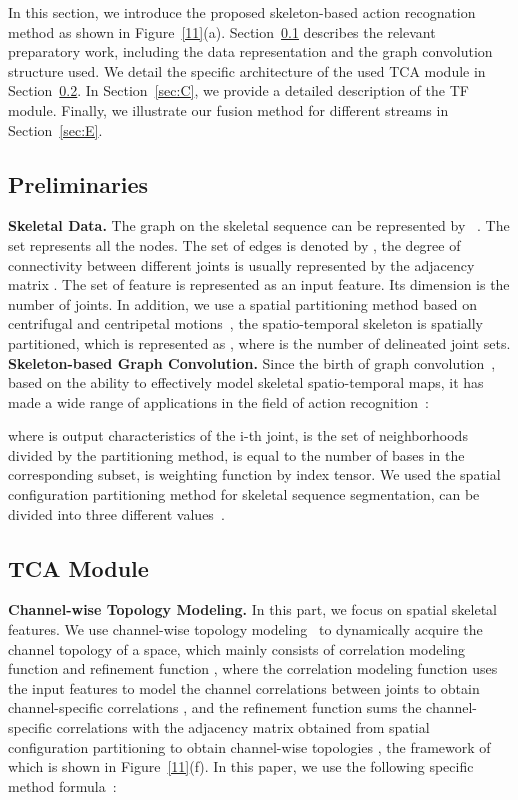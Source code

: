 \documentclass[letterpaper]{article} \usepackage[submission]{aaai23}  \usepackage{times}  \usepackage{helvet}  \usepackage{courier}  \usepackage[hyphens]{url}  \usepackage{graphicx} \urlstyle{rm} \def\UrlFont{\rm}  \usepackage{natbib}  \usepackage{caption} \frenchspacing  \setlength{\pdfpagewidth}{8.5in} \setlength{\pdfpageheight}{11in} \usepackage{algorithm}
\begin{document}
In this section, we introduce the proposed skeleton-based action recognation method as shown in Figure~\ref{11}(a). Section~\ref{sec:A} describes the relevant preparatory work, including the data representation and the graph convolution structure used. We detail the specific architecture of the used TCA module in Section~\ref{sec:B}. In Section~\ref{sec:C}, we provide a detailed description of the TF module. Finally, we illustrate our fusion method for different streams in Section~\ref{sec:E}. 


\subsection{Preliminaries}
\label{sec:A}
\noindent
{\bf Skeletal Data.} The graph on the skeletal sequence can be represented by ~\cite{DBLP:conf/aaai/YanXL18,2020sttr,2019Symbiotic}. The set  represents all the nodes. The set of edges is denoted by , the degree of connectivity between different joints is usually represented by the adjacency matrix . The set of feature  is represented as an input feature. Its dimension is the number of joints. In addition, we use a spatial partitioning method based on centrifugal and centripetal motions~\cite{DBLP:conf/aaai/YanXL18}, the spatio-temporal skeleton is spatially partitioned, which is represented as , where  is the number of delineated joint sets. \\
\noindent
{\bf Skeleton-based Graph Convolution.} Since the birth of graph convolution~\cite{2016Semi}, based on the ability to effectively model skeletal spatio-temporal maps, it has made a wide range of applications in the field of action recognition~\cite{DBLP:conf/aaai/YanXL18}:



where  is output characteristics of the i-th joint,  is the  set of neighborhoods divided by the partitioning method,  is equal to the number of bases in the corresponding subset,  is weighting function by index tensor. We used the spatial configuration partitioning method for skeletal sequence segmentation,  can be divided into three different values~\cite{DBLP:conf/aaai/YanXL18,2020Feedback,2019Symbiotic,2020Learning,2021Channel}.

\subsection{TCA Module}
\label{sec:B}
\noindent
{\bf Channel-wise Topology Modeling.} In this part, we focus on spatial skeletal features. We use channel-wise topology modeling~\cite{2021Channel} to dynamically acquire the channel topology of a space, which mainly consists of correlation modeling function  and refinement function , where the correlation modeling function uses the input features  to model the channel correlations between joints to obtain channel-specific correlations , and the refinement function sums the channel-specific correlations  with the adjacency matrix obtained from spatial configuration partitioning to obtain channel-wise topologies , the framework of which is shown in Figure~\ref{11}(f). In this paper, we use the following specific method formula~\cite{2021Channel}:
\end{document}
